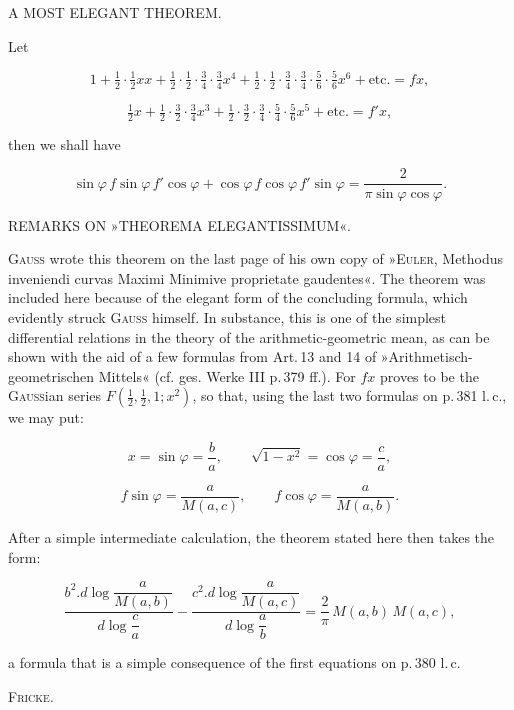 \clearpage
{}%

\begin{center}
\large A MOST ELEGANT THEOREM.
\end{center}

\bigskip

\noindent\hspace*{\parindent}Let

\[ 1+\tfrac{1}{2}\cdot\tfrac{1}{2}xx+\tfrac{1}{2}\cdot\tfrac{1}{2}\cdot\tfrac{3}{4}\cdot\tfrac{3}{4}x^4+\tfrac{1}{2}\cdot\tfrac{1}{2}\cdot\tfrac{3}{4}\cdot\tfrac{3}{4}\cdot\tfrac{5}{6}\cdot\tfrac{5}{6}x^6+\text{etc.} = fx, \]

\[ \tfrac{1}{2}x+\tfrac{1}{2}\cdot\tfrac{3}{2}\cdot\tfrac{3}{4}x^3+\tfrac{1}{2}\cdot\tfrac{3}{2}\cdot\tfrac{3}{4}\cdot\tfrac{5}{4}\cdot\tfrac{5}{6}x^5+\text{etc.} = f'x, \]

\noindent then we shall have

\[ \sin\varphi\, f\sin\varphi\, f'\cos\varphi + \cos\varphi\, f\cos\varphi\, f'\sin\varphi = \frac{2}{\pi\sin\varphi\cos\varphi}. \]

\bigskip

\bigskip

\begin{center}
REMARKS ON »THEOREMA ELEGANTISSIMUM«.
\end{center}

\noindent\hspace*{\parindent}\textsc{Gauss} wrote this theorem on the last page of his own copy of »\textsc{Euler}, Methodus inveniendi curvas Maximi Minimive proprietate gaudentes«. The theorem was included here because of the elegant form of the concluding formula, which evidently struck \textsc{Gauss} himself. In substance, this is one of the simplest differential relations in the theory of the arithmetic-geometric mean, as can be shown with the aid of a few formulas from Art.\,13 and 14 of »Arithmetisch-geometrischen Mittels« (cf. ges. Werke III p.\,379 ff.). For $fx$ proves to be the \textsc{Gauss}ian series $F(\tfrac{1}{2},\tfrac{1}{2},1;x^2)$, so that, using the last two formulas on p.\,381 l.\,c., we may put:

\[ x=\sin\varphi=\frac{b}{a}, \qquad \sqrt{1-x^2}=\cos\varphi=\frac{c}{a}, \]

\[ f\sin\varphi=\frac{a}{M( a,c)}, \qquad f\cos\varphi=\frac{a}{M( a,b)}. \]

\noindent After a simple intermediate calculation, the theorem stated here then takes the form:

\[ \frac{b^2\mathord{.} d\log\dfrac{a}{M( a,b)}}{d\log\dfrac{c}{a}} - \frac{c^2\mathord{.} d\log\dfrac{a}{M( a,c)}}{d\log\dfrac{a}{b}} = \frac{2}{\pi}\,M( a,b)\,M( a,c), \]

\noindent a formula that is a simple consequence of the first equations on p.\,380 l.\,c.

\hfill \textsc{Fricke}.

\bigskip

